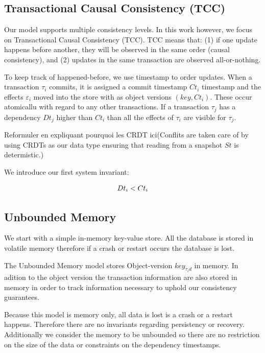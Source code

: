 \documentclass[systeme,french,english]{compas2022}
\begin{document}
\subsection{Transactional Causal Consistency (TCC)}

Our model supports multiple consistency levels. In this work however, we focus on Transactional Causal Consistency (TCC).
TCC means that: (1) if one update happens before another, they will be observed in the same order (causal consistency), and (2) updates in the same transaction are observed all-or-nothing.

To keep track of happened-before, we use timestamp to order updates.
When a transaction $\tau_i$ commits, it is assigned a commit timestamp $Ct_i$ timestamp and the effects $\varepsilon_i$ moved into the store with as object versions $(key,Ct_i)$.
These occur atomicallu with regard to any other transactions.
If a transaction $\tau_j$ has a dependency $Dt_j$ higher than $Ct_i$ than all the effects of $\tau_i$ are visible for $\tau_j$.

Reformuler en expliquant pourquoi les CRDT ici(Conflits are taken care of by using CRDTs as our data type ensuring that reading from a snapshot $St$ is determistic.)

We introduce our first system invariant:

\[
  \begin{array}{lcl}
    \emph{$Dt_i < Ct_i$}
  \end{array} 
\]

\subsection{Unbounded Memory}

We start with a simple in-memory key-value store.
All the database is stored in volatile memory therefore if a crash or restart occurs the database is lost.

The Unbounded Memory model stores Object-version $key_{\tau_id}$ in memory.
In adition to the object version the transaction information are also stored in memory in order to track information necessary to uphold our consistency guarantees.

Because this model is memory only, all data is lost is a crash or a restart happens.
Therefore there are no invariants regarding persistency or recovery.
Additionally we consider the memory to be unbounded so there are no restriction on the size of the data or constraints on the dependency timestamps.
\end{document}
